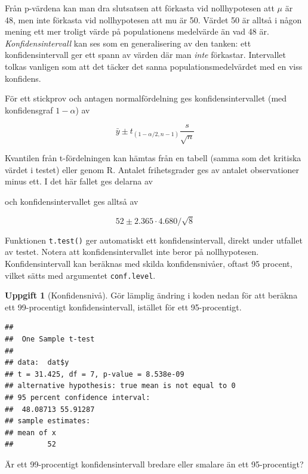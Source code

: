 \documentclass[
]{book}
\newenvironment{Shaded}{\begin{snugshade}}{\end{snugshade}}
\newcommand{\AttributeTok}[1]{\textcolor[rgb]{0.13,0.29,0.53}{#1}}
\newcommand{\DecValTok}[1]{\textcolor[rgb]{0.00,0.00,0.81}{#1}}
\newcommand{\FloatTok}[1]{\textcolor[rgb]{0.00,0.00,0.81}{#1}}
\newcommand{\FunctionTok}[1]{\textcolor[rgb]{0.13,0.29,0.53}{\textbf{#1}}}
\newcommand{\NormalTok}[1]{#1}
\newcommand{\SpecialCharTok}[1]{\textcolor[rgb]{0.81,0.36,0.00}{\textbf{#1}}}
\theoremstyle{definition}
\theoremstyle{definition}
\theoremstyle{definition}
\newtheorem{exercise}{Uppgift}[chapter]
\theoremstyle{definition}
\theoremstyle{remark}
\begin{document}
Från p-värdena kan man dra slutsatsen att förkasta vid nollhypotesen att \(\mu\) är 48, men inte förkasta vid nollhypotesen att mu är 50. Värdet 50 är alltså i någon mening ett mer troligt värde på populationens medelvärde än vad 48 är. \emph{Konfidensintervall} kan ses som en generalisering av den tanken: ett konfidensintervall ger ett spann av värden där man \emph{inte} förkastar. Intervallet tolkas vanligen som att det täcker det sanna populationsmedelvärdet med en viss konfidens.

För ett stickprov och antagen normalfördelning ges konfidensintervallet (med konfidensgraf \(1-\alpha\)) av

\[\bar y \pm t_{(1-\alpha/2,n-1)} \frac{s}{\sqrt n}\]

Kvantilen från t-fördelningen kan hämtas från en tabell (samma som det kritiska värdet i testet) eller genom R. Antalet frihetsgrader ges av antalet observationer minus ett. I det här fallet ges delarna av

\begin{Shaded}
\end{Shaded}

och konfidensintervallet ges alltså av

\[52 \pm 2.365 \cdot 4.680 / \sqrt 8\]

Funktionen \texttt{t.test()} ger automatiskt ett konfidensintervall, direkt under utfallet av testet. Notera att konfidensintervallet inte beror på nollhypotesen. Konfidensintervall kan beräknas med skilda konfidensnivåer, oftast 95 procent, vilket sätts med argumentet \texttt{conf.level}.

\begin{exercise}[Konfidensnivå]
Gör lämplig ändring i koden nedan för att beräkna ett 99-procentigt konfidensintervall, istället för ett 95-procentigt.

\begin{Shaded}
\end{Shaded}

\begin{verbatim}
## 
##  One Sample t-test
## 
## data:  dat$y
## t = 31.425, df = 7, p-value = 8.538e-09
## alternative hypothesis: true mean is not equal to 0
## 95 percent confidence interval:
##  48.08713 55.91287
## sample estimates:
## mean of x 
##        52
\end{verbatim}

Är ett 99-procentigt konfidensintervall bredare eller smalare än ett 95-procentigt?
\end{exercise}
\end{document}
